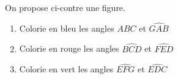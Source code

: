 \begin{pageAD} 



\begin{minipage}{0.5\linewidth}
On propose ci-contre une figure.
\begin{enumerate}
\item Colorie en bleu les angles $\widehat{ABC}$ et  $\widehat{GAB}$
\item Colorie en rouge les angles $\widehat{BCD}$ et  $\widehat{FED}$
\item Colorie en vert les angles $\widehat{EFG}$ et  $\widehat{EDC}$
\end{enumerate}

\end{minipage}
\begin{minipage}{0.5\linewidth}


\end{minipage}
\end{pageAD}

